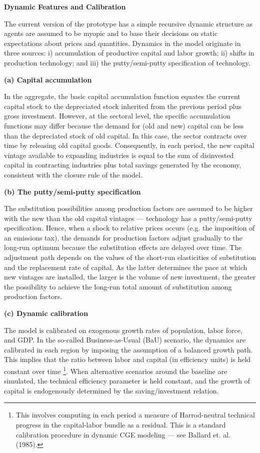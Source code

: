 \documentclass[12pt]{article}
\begin{document}
\textbf{Dynamic Features and Calibration}

The current version of the prototype has a simple recursive dynamic structure as agents are assumed to be myopic and to base their decisions on static expectations about prices and quantities. Dynamics in the model originate in three sources: i) accumulation of productive capital and labor growth; ii) shifts in production technology; and iii) the putty/semi-putty specification of technology.

\hspace{20pt}\textbf{(a) Capital accumulation}

In the aggregate, the basic capital accumulation function equates the current capital stock to the depreciated stock inherited from the previous period plus gross investment. However, at the sectoral level, the specific accumulation functions may differ because the demand for (old and new) capital can be less than the depreciated stock of old capital. In this case, the sector contracts over time by releasing old capital goods. Consequently, in each period, the new capital vintage available to expanding industries is equal to the sum of disinvested capital in contracting industries plus total savings generated by the economy, consistent with the closure rule of the model.

\hspace{20pt}\textbf{(b) The putty/semi-putty specification}

The substitution possibilities among production factors are assumed to be higher with the new than the old capital vintages — technology has a putty/semi-putty specification. Hence, when a shock to relative prices occurs (e.g. the imposition of an emissions tax), the demands for production factors adjust gradually to the long-run optimum because the substitution effects are delayed over time. The adjustment path depends on the values of the short-run elasticities of substitution and the replacement rate of capital. As the latter determines the pace at which new vintages are installed, the larger is the volume of new investment, the greater the possibility to achieve the long-run total amount of substitution among production factors.

\hspace{20pt}\textbf{(c) Dynamic calibration}

The model is calibrated on exogenous growth rates of population, labor force, and GDP. In the so-called Business-as-Usual (BaU) scenario, the dynamics are calibrated in each region by imposing the assumption of a balanced growth path. This implies that the ratio between labor and capital (in efficiency units) is held constant over time \footnote{This involves computing in each period a measure of Harrod-neutral technical progress in the capital-labor bundle as a residual. This is a standard calibration procedure in dynamic CGE modeling — see Ballard et. al. (1985).}. When alternative scenarios around the baseline are simulated, the technical efficiency parameter is held constant, and the growth of capital is endogenously determined by the saving/investment relation.
\end{document}

